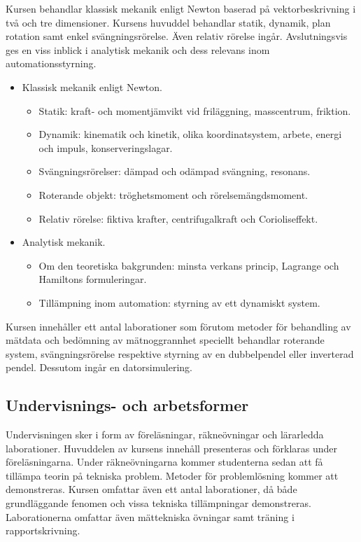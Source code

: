 Kursen behandlar klassisk mekanik enligt Newton baserad på
vektorbeskrivning i två och tre dimensioner. Kursens huvuddel behandlar
statik, dynamik, plan rotation samt enkel svängningsrörelse. Även
relativ rörelse ingår. Avslutningsvis ges en viss inblick i analytisk
mekanik och dess relevans inom automationsstyrning.

\begin{itemize}
\tightlist
\item
  Klassisk mekanik enligt Newton.

  \begin{itemize}
  \tightlist
  \item
    Statik: kraft- och momentjämvikt vid friläggning, masscentrum,
    friktion.
  \item
    Dynamik: kinematik och kinetik, olika koordinatsystem, arbete,
    energi och impuls, konserveringslagar.
  \item
    Svängningsrörelser: dämpad och odämpad svängning, resonans.
  \item
    Roterande objekt: tröghetsmoment och rörelsemängdsmoment.
  \item
    Relativ rörelse: fiktiva krafter, centrifugalkraft och
    Corioliseffekt.
  \end{itemize}
\item
  Analytisk mekanik.

  \begin{itemize}
  \tightlist
  \item
    Om den teoretiska bakgrunden: minsta verkans princip, Lagrange och
    Hamiltons formuleringar.
  \item
    Tillämpning inom automation: styrning av ett dynamiskt system.
  \end{itemize}
\end{itemize}

Kursen innehåller ett antal laborationer som förutom metoder för
behandling av mätdata och bedömning av mätnoggrannhet speciellt
behandlar roterande system, svängningsrörelse respektive styrning av en
dubbelpendel eller inverterad pendel. Dessutom ingår en datorsimulering.

\subsection*{Undervisnings- och
arbetsformer}

Undervisningen sker i form av föreläsningar, räkneövningar och
lärarledda laborationer. Huvuddelen av kursens innehåll presenteras och
förklaras under föreläsningarna. Under räkneövningarna kommer
studenterna sedan att få tillämpa teorin på tekniska problem. Metoder
för problemlösning kommer att demonstreras. Kursen omfattar även ett
antal laborationer, då både grundläggande fenomen och vissa tekniska
tillämpningar demonstreras. Laborationerna omfattar även mättekniska
övningar samt träning i rapportskrivning.

